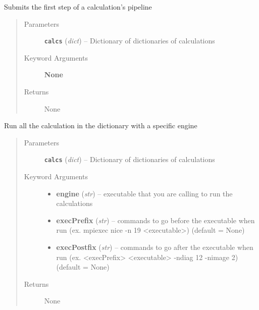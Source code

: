\documentclass[letterpaper,10pt,english]{sphinxmanual}
\begin{document}

\begin{fulllineitems}
\label{run:run.submitFirstCalcs__}
Submits the first step of a calculation's pipeline
\begin{quote}\begin{description}
\item[{Parameters}] \leavevmode
\textbf{\texttt{calcs}} (\emph{dict}) -- Dictionary of dictionaries of calculations

\item[{Keyword Arguments}] \leavevmode
\textbf{None}

\item[{Returns}] \leavevmode
None

\end{description}\end{quote}

\end{fulllineitems}


\begin{fulllineitems}
\label{run:run.testOne}
Run all the calculation in the dictionary with a specific engine
\begin{quote}\begin{description}
\item[{Parameters}] \leavevmode
\textbf{\texttt{calcs}} (\emph{dict}) -- Dictionary of dictionaries of calculations

\item[{Keyword Arguments}] \leavevmode\begin{itemize}
\item {} 
\textbf{engine} (\emph{str}) --
executable that you are calling to run the calculations

\item {} 
\textbf{execPrefix} (\emph{str}) --
commands to go before the executable when run
(ex. mpiexec nice -n 19 \textless{}executable\textgreater{}) (default = None)

\item {} 
\textbf{execPostfix} (\emph{str}) --
commands to go after the executable when run
(ex. \textless{}execPrefix\textgreater{} \textless{}executable\textgreater{} -ndiag 12 -nimage 2) (default = None)

\end{itemize}

\item[{Returns}] \leavevmode
None

\end{description}\end{quote}

\end{fulllineitems}
\end{document}
